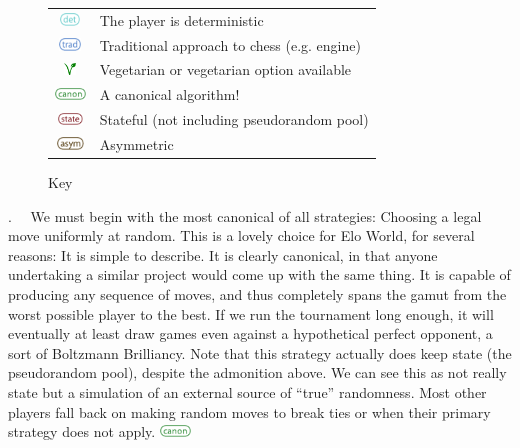\documentclass[10pt,preprint,twocolumn]{acmart}
\begin{document}
\newcommand\describeplayer[1]{\smallskip\noindent {\texttt{\textbf{#1}}}.\ \ }
\newcommand\player[1]{\texttt{#1}}
\newcommand\russian{
  \includegraphics[height=0.9em]{zazdarovye}
}
\newcommand\deterministic{
  \includegraphics[height=0.9em]{deterministic}
}
\newcommand\traditional{
  \includegraphics[height=0.9em]{traditional}
}
\newcommand\vegetarian{
  \includegraphics[height=0.9em]{vegetarian}
}
\newcommand\canonical{
  \includegraphics[height=0.9em]{canonical}
}
\newcommand\stateful{
  \includegraphics[height=0.9em]{stateful}
}
\newcommand\asymmetric{
  \includegraphics[height=0.9em]{asymmetric}
}

\begin{figure}[t]
\begin{tabular}{cl}
  \deterministic & The player is deterministic \\
  \traditional & Traditional approach to chess (e.g. engine) \\
  \vegetarian & Vegetarian or vegetarian option available \\
  \canonical & A canonical algorithm! \\
  \stateful & Stateful (not including pseudorandom pool) \\
  \asymmetric & Asymmetric \\
\end{tabular}
\caption{Key} \label{fig:key}
\end{figure}

\describeplayer{random\_move} We must begin with the most canonical of all
strategies: Choosing a legal move uniformly at random. This is a
lovely choice for Elo World, for several reasons: It is simple to
describe. It is clearly canonical, in that anyone undertaking a
similar project would come up with the same thing. It is capable of
producing any sequence of moves, and thus completely spans the gamut
from the worst possible player to the best. If we run the tournament
long enough, it will eventually at least draw games even against a
hypothetical perfect opponent, a sort of Boltzmann Brilliancy. Note
that this strategy actually does keep state (the pseudorandom pool),
despite the admonition above. We can see this as not really state but
a simulation of an external source of ``true'' randomness. Most other
players fall back on making random moves to break ties or when their
primary strategy does not apply. \canonical
\end{document}
